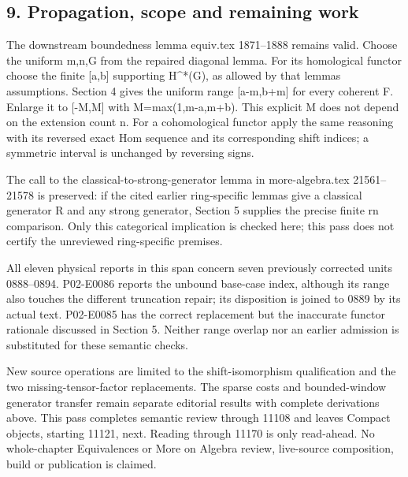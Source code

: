 \subsection{\texorpdfstring{9. Propagation,\allowbreak{} scope and remaining work}{9.  scope and remaining work}}\label{proofs-10691-11108-propagation-scope-and-remaining-work}

The downstream boundedness lemma equiv.tex 1871–\allowbreak{}1888 remains valid. Choose the uniform m,\allowbreak{}n,\allowbreak{}G from the repaired diagonal lemma. For its homological functor choose the finite [a,\allowbreak{}b]\allowbreak{} supporting H\textasciicircum{}*(G)\allowbreak{},\allowbreak{} as allowed by that lemma\textquotesingle s assumptions. Section 4 gives the uniform range [a-m,\allowbreak{}b\allowbreak{}+m]\allowbreak{} for every coherent F. Enlarge it to [-M,\allowbreak{}M]\allowbreak{} with M\allowbreak{}=max(1,\allowbreak{}m-a,\allowbreak{}m\allowbreak{}+b)\allowbreak{}. This explicit M does not depend on the extension count n. For a cohomological functor apply the same reasoning with its reversed exact Hom sequence and its corresponding shift indices; a symmetric interval is unchanged by reversing signs.

The call to the classical-to-strong-generator lemma in more-algebra.tex 21561–\allowbreak{}21578 is preserved:\allowbreak{} if the cited earlier ring-specific lemmas give a classical generator R and any strong generator,\allowbreak{} Section 5 supplies the precise finite rn comparison. Only this categorical implication is checked here; this pass does not certify the unreviewed ring-specific premises.

All eleven physical reports in this span concern seven previously corrected units 0888–\allowbreak{}0894. P02-E0086 reports the unbound base-case index,\allowbreak{} although its range also touches the different truncation repair; its disposition is joined to 0889 by its actual text. P02-E0085 has the correct replacement but the inaccurate functor rationale discussed in Section 5. Neither range overlap nor an earlier admission is substituted for these semantic checks.

New source operations are limited to the shift-isomorphism qualification and the two missing-tensor-factor replacements. The sparse costs and bounded-window generator transfer remain separate editorial results with complete derivations above. This pass completes semantic review through 11108 and leaves Compact objects,\allowbreak{} starting 11121,\allowbreak{} next. Reading through 11170 is only read-ahead. No whole-chapter Equivalences or More on Algebra review,\allowbreak{} live-source composition,\allowbreak{} build or publication is claimed.

